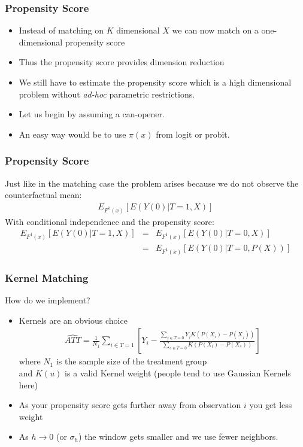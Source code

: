 \documentclass[xcolor=pdftex,dvipsnames,table,mathserif,aspectratio=169]{beamer}
\begin{document}
\begin{frame}
\frametitle{Propensity Score}
\begin{itemize}
\item Instead of matching on $K$ dimensional $X$ we can now match on a one-dimensional propensity score
\item Thus the propensity score provides \alert{dimension reduction}
\item We still have to estimate the propensity score which is a high dimensional problem without \textit{ad-hoc} parametric restrictions.
\item Let us begin by assuming a can-opener.
\item An easy way would be to use $\pi(x)$ from logit or probit.
\end{itemize}
\end{frame}


\begin{frame}
\frametitle{Propensity Score}
Just like in the matching case the problem arises because we do not observe the counterfactual mean:
\begin{eqnarray*}
 E_{F^1(x)} [E(Y(0) | T=1,X)] 
\end{eqnarray*}
With conditional independence and the propensity score:
\begin{eqnarray*}
 E_{F^1(x)} [E(Y(0) | T=1,X)]  &=&  E_{F^1(x)} [E(Y(0) | T=0,X)] \\
 &=&  E_{F^1(x)} [E(Y(0) | T=0,P(X))] 
\end{eqnarray*}
\end{frame}

\begin{frame}
\frametitle{Kernel Matching}
How do we implement?
\begin{itemize}
\item Kernels are an obvious choice
\begin{eqnarray*}
\widehat{ATT} = \frac{1}{N_1} \sum_{i \in T=1} \left[Y_i - \frac{\sum_{j \in T=0} Y_j K\left(P(X_i) - P(X_j) \right) }{\sum_{s \in T=0}  K\left(P(X_i) - P(X_s) \right)}   \right]
\end{eqnarray*}
 where $N_1$ is the sample size of the treatment group \\
 and $K(u)$ is a valid Kernel weight (people tend to use Gaussian Kernels here)
\item As your propensity score gets further away from observation $i$ you get less weight
\item As $h \rightarrow 0$  (or $\sigma_h$) the window gets smaller and we use fewer neighbors.
\end{itemize}
\end{frame}
\end{document}
